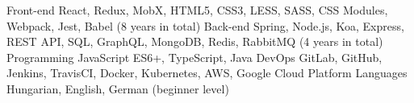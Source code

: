 

\begin{cvskills}

  \cvskill
    {Front-end} %
    {React, Redux, MobX, HTML5, CSS3, LESS, SASS, CSS Modules, Webpack, Jest, Babel (8 years in total)} %
  \cvskill
    {Back-end} %
    {Spring, Node.js, Koa, Express, REST API, SQL, GraphQL, MongoDB, Redis, RabbitMQ (4 years in total)} %
  \cvskill
    {Programming} %
    {JavaScript ES6+, TypeScript, Java} %
  \cvskill
    {DevOps} %
    {GitLab, GitHub, Jenkins, TravisCI, Docker, Kubernetes, AWS, Google Cloud Platform} %
  \cvskill
    {Languages} %
    {Hungarian, English, German (beginner level)} %

\end{cvskills}
